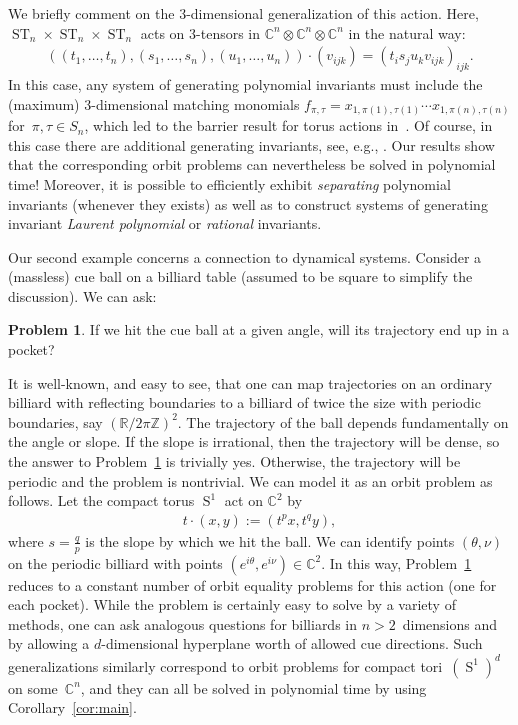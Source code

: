 \documentclass[10pt,a4paper]{article}
\DeclareMathOperator{\ST}{ST}
\DeclareMathOperator{\Ss}{S}
\theoremstyle{definition}
\newtheorem{problem}[theorem]{Problem}
\numberwithin{equation}{section}
\newcommand{\CC}{\mathbb{C}}
\newcommand{\ZZ}{\mathbb{Z}}
\newcommand{\RR}{\mathbb{R}}
\begin{document}
%
%
%
%
%
%
%
%
%
%
%
%
%
%
%

We briefly comment on the 3-dimensional generalization of this action.
Here, $\ST_n \times \ST_n \times \ST_n$ acts on 3-tensors in $\CC^n \otimes \CC^n \otimes \CC^n$ in the natural way:
\begin{align*}
  ((t_1,\dots,t_n),(s_1,\dots,s_n),(u_1,\dots,u_n)) \cdot (v_{ijk}) = (t_i s_j u_k v_{ijk})_{ijk}.
\end{align*}
In this case, any system of generating polynomial invariants must include the (maximum) 3-dimensional matching monomials $f_{\pi,\tau} = x_{1,\pi(1),\tau(1)} \cdots x_{1,\pi(n),\tau(n)}$ for~$\pi,\tau\in S_n$, which led to the barrier result for torus actions in~\cite{GIMOWW}.
Of course, in this case there are additional generating invariants, see, e.g., \cite{linial2014vertices}.
Our results show that the corresponding orbit problems can nevertheless be solved in polynomial time!
Moreover, it is possible to efficiently exhibit \emph{separating} polynomial invariants (whenever they exists) as well as to construct systems of generating invariant \emph{Laurent polynomial} or \emph{rational} invariants.

Our second example concerns a connection to dynamical systems.
Consider a (massless) cue ball on a billiard table (assumed to be square to simplify the discussion).
We can ask:

\begin{problem}\label{prblm:billiard}
If we hit the cue ball at a given angle, will its trajectory end up in a pocket?
\end{problem}

It is well-known, and easy to see, that one can map trajectories on an ordinary billiard with reflecting boundaries to a billiard of twice the size with periodic boundaries, say $(\RR/2\pi\ZZ)^2$.
The trajectory of the ball depends fundamentally on the angle or slope. 
If the slope is irrational, then the trajectory will be dense, so the answer to Problem~\ref{prblm:billiard} is trivially yes.
Otherwise, the trajectory will be periodic and the problem is nontrivial.
We can model it as an orbit problem as follows.
Let the compact torus $\Ss^1$ act on $\CC^2$ by
\begin{align*}
  t \cdot (x,y) := (t^p x, t^q y),
\end{align*}
where $s=\frac qp$ is the slope by which we hit the ball.
We can identify points $(\theta,\nu)$ on the periodic billiard with points $(e^{i\theta},e^{i\nu}) \in \CC^2$.
In this way, Problem~\ref{prblm:billiard} reduces to a constant number of orbit equality problems for this action (one for each pocket).
While the problem is certainly easy to solve by a variety of methods, one can ask analogous questions for billiards in $n>2$~dimensions and by allowing a $d$-dimensional hyperplane worth of allowed cue directions.
Such generalizations similarly correspond to orbit problems for compact tori~$(\Ss^1)^d$ on some~$\CC^n$, and they can all be solved in polynomial time by using Corollary~\ref{cor:main}.
\end{document}
